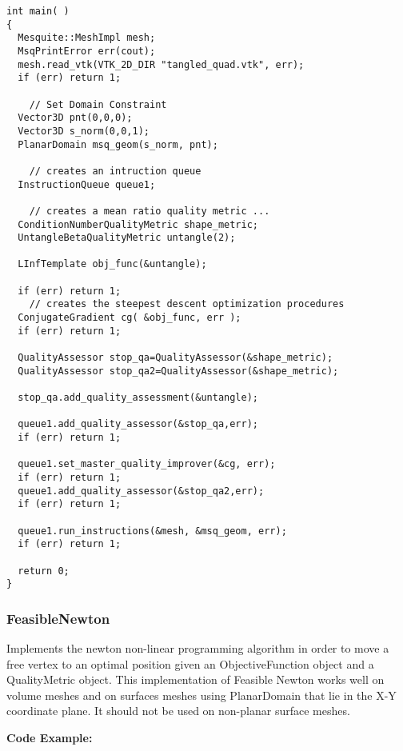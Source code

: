 \begin{lstlisting}[frame=single]
int main( )
{
  Mesquite::MeshImpl mesh;
  MsqPrintError err(cout);
  mesh.read_vtk(VTK_2D_DIR "tangled_quad.vtk", err);
  if (err) return 1;
  
    // Set Domain Constraint
  Vector3D pnt(0,0,0);
  Vector3D s_norm(0,0,1);
  PlanarDomain msq_geom(s_norm, pnt);
                                                                              
    // creates an intruction queue
  InstructionQueue queue1;
  
    // creates a mean ratio quality metric ...
  ConditionNumberQualityMetric shape_metric;
  UntangleBetaQualityMetric untangle(2);

  LInfTemplate obj_func(&untangle);

  if (err) return 1;
    // creates the steepest descent optimization procedures
  ConjugateGradient cg( &obj_func, err );
  if (err) return 1;
  
  QualityAssessor stop_qa=QualityAssessor(&shape_metric);
  QualityAssessor stop_qa2=QualityAssessor(&shape_metric);
   
  stop_qa.add_quality_assessment(&untangle);

  queue1.add_quality_assessor(&stop_qa,err); 
  if (err) return 1;
 
  queue1.set_master_quality_improver(&cg, err);
  if (err) return 1;
  queue1.add_quality_assessor(&stop_qa2,err);
  if (err) return 1;

  queue1.run_instructions(&mesh, &msq_geom, err);
  if (err) return 1;
  
  return 0;
}
\end{lstlisting}


\subsubsection{FeasibleNewton}
Implements the newton non-linear programming algorithm in order to move a free vertex to an optimal position given an ObjectiveFunction object and a QualityMetric object.  This implementation of Feasible Newton works well on volume meshes and on surfaces meshes using PlanarDomain that lie in the X-Y coordinate plane. It should not be used on non-planar surface meshes.

\textbf{Code Example:}

